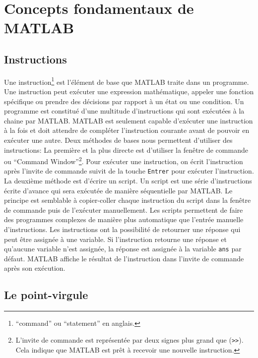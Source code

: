 \documentclass[]{tufte-handout}
\newcommand{\passthrough}[1]{#1}
\begin{document}
\hypertarget{concepts-fondamentaux-de-matlab}{%
\section{Concepts fondamentaux de
MATLAB}\label{concepts-fondamentaux-de-matlab}}

\hypertarget{instructions}{%
\subsection{Instructions}\label{instructions}}

Une instruction\footnote{``command'' ou ``statement'' en anglais.} est
l'élément de base que MATLAB traite dans un programme. Une instruction
peut exécuter une expression mathématique, appeler une fonction
spécifique ou prendre des décisions par rapport à un état ou une
condition. Un programme est constitué d'une multitude d'instructions qui
sont exécutées à la chaine par MATLAB. MATLAB est seulement capable
d'exécuter une instruction à la fois et doit attendre de compléter
l'instruction courante avant de pouvoir en exécuter une autre. Deux
méthodes de bases nous permettent d'utiliser des instructions: La
première et la plus directe est d'utiliser la fenêtre de commande ou
``Command Window''\footnote{L'invite de commande est représentée par
  deux signes plus grand que (\passthrough{\lstinline!>>!}). Cela
  indique que MATLAB est prêt à recevoir une nouvelle instruction.}.
Pour exécuter une instruction, on écrit l'instruction après l'invite de
commande suivit de la touche \passthrough{\lstinline!Entrer!} pour
exécuter l'instruction. La deuxième méthode est d'écrire un script. Un
script est une série d'instructions écrite d'avance qui sera exécutée de
manière séquentielle par MATLAB. Le principe est semblable à
copier-coller chaque instruction du script dans la fenêtre de commande
puis de l'exécuter manuellement. Les scripts permettent de faire des
programmes complexes de manière plus automatique que l'entrée manuelle
d'instructions. Les instructions ont la possibilité de retourner une
réponse qui peut être assignée à une variable. Si l'instruction retourne
une réponse et qu'aucune variable n'est assignée, la réponse est
assignée à la variable \passthrough{\lstinline!ans!} par défaut. MATLAB
affiche le résultat de l'instruction dans l'invite de commande après son
exécution.

\hypertarget{le-point-virgule}{%
\subsection{Le point-virgule}\label{le-point-virgule}}
\end{document}
